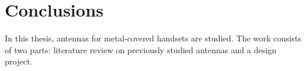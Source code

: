 \section{Conclusions} 
\label{sec:conclusions}

\begin{comment}
\begin{itemize}
\item[--]yhteenveto mitä tehty
\item[--]päätulokset
\item[--]johtopäätökset
\item[--]oma arvio?
\end{itemize}
\end{comment}

In this thesis, antennas for metal-covered handsets are studied. The work consists of two parts: literature review on previously studied antennas and a design project. 

\clearpage